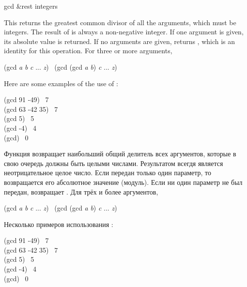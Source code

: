 \begin{defun}[Function]
gcd &rest integers

This returns the greatest common divisor of all the arguments,
which must be integers.  The result of  is always a non-negative
integer.
If one argument is given, its absolute value is returned.
If no arguments are given,  returns ,
which is an identity for this operation.
For three or more arguments,
\begin{lisp}
(gcd \emph{a} \emph{b} \emph{c} ... \emph{z}) \EQ\ (gcd (gcd \emph{a} \emph{b}) \emph{c} ... \emph{z})
\end{lisp}

Here are some examples of the use of :
\begin{lisp}
(gcd 91 -49) \EV\ 7 \\
(gcd 63 -42 35) \EV\ 7 \\
(gcd 5) \EV\ 5 \\
(gcd -4) \EV\ 4 \\
(gcd) \EV\ 0
\end{lisp}

Функция возвращает наибольший общий делитель всех аргументов, которые в свою
очередь должны быть целыми числами. Результатом  всегдя является
неотрицательное целое число.
Если передан только один параметр, то возвращается его абсолютное значение
(модуль).
Если ни один параметр не был передан,  возвращает .
Для трёх и более аргументов,
\begin{lisp}
(gcd \emph{a} \emph{b} \emph{c} ... \emph{z}) \EQ\ (gcd (gcd \emph{a} \emph{b}) \emph{c} ... \emph{z})
\end{lisp}

Несколько примеров использования :
\begin{lisp}
(gcd 91 -49) \EV\ 7 \\
(gcd 63 -42 35) \EV\ 7 \\
(gcd 5) \EV\ 5 \\
(gcd -4) \EV\ 4 \\
(gcd) \EV\ 0
\end{lisp}
\end{defun}

